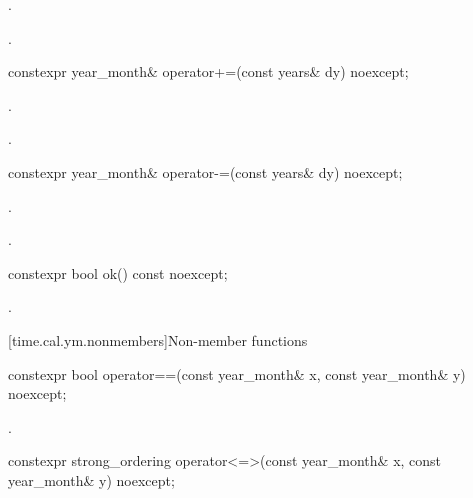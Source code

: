 \begin{itemdescr}
\pnum
\effects
{}.

\pnum
\returns
{}.
\end{itemdescr}

%
\begin{itemdecl}
constexpr year_month& operator+=(const years& dy) noexcept;
\end{itemdecl}

\begin{itemdescr}
\pnum
\effects
{}.

\pnum
\returns
{}.
\end{itemdescr}

%
\begin{itemdecl}
constexpr year_month& operator-=(const years& dy) noexcept;
\end{itemdecl}

\begin{itemdescr}
\pnum
\effects
{}.

\pnum
\returns
{}.
\end{itemdescr}

%
\begin{itemdecl}
constexpr bool ok() const noexcept;
\end{itemdecl}

\begin{itemdescr}
\pnum
\returns
{}.
\end{itemdescr}

[time.cal.ym.nonmembers]{Non-member functions}

%
\begin{itemdecl}
constexpr bool operator==(const year_month& x, const year_month& y) noexcept;
\end{itemdecl}

\begin{itemdescr}
\pnum
\returns
{}.
\end{itemdescr}

%
\begin{itemdecl}
constexpr strong_ordering operator<=>(const year_month& x, const year_month& y) noexcept;
\end{itemdecl}

